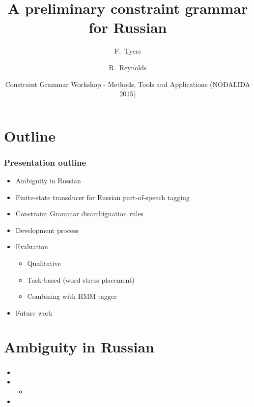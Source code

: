 \documentclass{beamer}
\title[A preliminary constraint grammar for Russian] %
{A preliminary constraint grammar for Russian}
\author[Tyers, Reynolds] %
{F.~Tyers \and R.~Reynolds}
\institute[University of Troms\o] %
{
  Department of Languages and Linguistics\\
  University of Troms\o
}
\date[NODALIDA-CG 2015] %
{Constraint Grammar Workshop - Methods, Tools and Applications (NODALIDA 2015)}
\begin{document}
\frame{\titlepage}
 
\section{Outline}

\begin{frame}
\frametitle{Presentation outline}
\begin{itemize}
	\item Ambiguity in Russian
	\pause
	\item Finite-state transducer for Russian part-of-speech tagging
	\pause
	\item Constraint Grammar disambiguation rules
	\pause
	\item Development process
	\pause
	\item Evaluation
	\pause
	\begin{itemize}
		\item Qualitative
		\pause
		\item Task-based (word stress placement)
		\pause
		\item Combining with HMM tagger
	\end{itemize}
	\pause
	\item Future work
\end{itemize}
\end{frame}

\section{Ambiguity in Russian} %
\begin{frame}
\frametitle{}
\framesubtitle{}
\begin{itemize}
	\item 
	\pause
	\item 
	\begin{itemize}
		\item 
		\pause
	\end{itemize}
	\item 
\end{itemize}
\end{frame}
\end{document}
